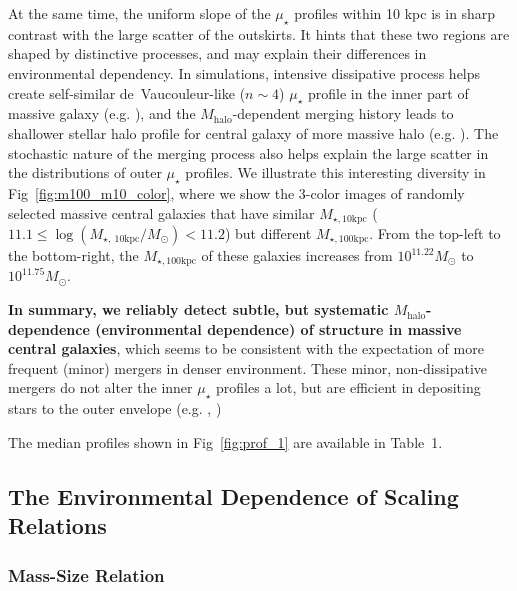 \documentclass[a4paper,fleqn,usenatbib]{mnras}
\def\mhalo{{$M_{\mathrm{halo}}$}}
\def\minn{{$M_{\star,10\mathrm{kpc}}$}}
\def\mtot{{$M_{\star,100\mathrm{kpc}}$}}
\def\mden{{$\mu_{\star}$}}
\begin{document}
    At the same time, the uniform slope of the \mden{} profiles within 
    10 kpc is in sharp contrast with the large scatter of the outskirts. 
    It hints that these two regions are shaped by distinctive processes, and may 
    explain their differences in environmental dependency. 
    In simulations, intensive dissipative process helps create 
    self-similar de~Vaucouleur-like ($n{\sim} 4$) \mden{} profile in the inner part 
    of massive galaxy (e.g. \citealt{Hopkins2008}), and the \mhalo{}-dependent
    merging history leads to shallower stellar halo profile for central galaxy 
    of more massive halo (e.g. \citealt{Pillepich2014}). 
    The stochastic nature of the merging process also helps explain the 
    large scatter in the distributions of outer \mden{} profiles. 
    We illustrate this interesting diversity in Fig~\ref{fig:m100_m10_color}, where 
    we show the 3-color images of randomly selected massive central galaxies that 
    have similar \minn{} 
    ($11.1 \leq \log (M_{\star,\ 10\mathrm{kpc}}/M_{\odot}) < 11.2$)
    but different \mtot{}.   
    From the top-left to the bottom-right, the \mtot{} of these galaxies increases
    from $10^{11.22} M_{\odot}$ to $10^{11.75} M_{\odot}$.

    \textbf{In summary, we reliably detect subtle, but systematic \mhalo{}-dependence 
    (environmental dependence) of structure in massive central galaxies}, which seems 
    to be consistent with the expectation of more frequent (minor) mergers in denser 
    environment. 
    These minor, non-dissipative mergers do not alter the inner \mden{} profiles 
    a lot, but are efficient in depositing stars to the outer envelope
    (e.g. \citealt{Hilz2013}, \citealt{Oogi2013})      
      
    The median profiles shown in Fig~\ref{fig:prof_1} are available in Table~1.

\subsection{The Environmental Dependence of Scaling Relations}
    \label{ssec:scaling}

\subsubsection{Mass-Size Relation}
    \label{sssec:mass_size}
        
\end{document}
